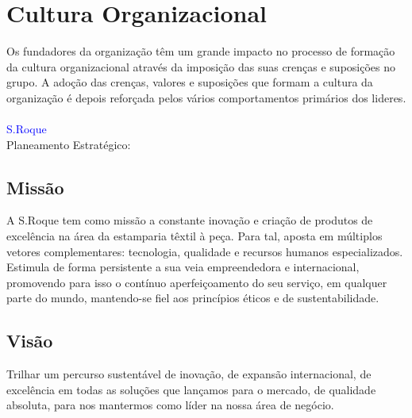 \section{Cultura Organizacional}
\qquad Os fundadores da organização têm um grande impacto no processo de formação da cultura organizacional através da imposição das suas crenças e suposições no grupo. A adoção das crenças, valores e suposições que formam a cultura da organização é depois reforçada pelos vários comportamentos primários dos lideres.\\
\\
\textcolor{blue}{\Large{S.Roque}}\\
Planeamento Estratégico:
\subsection{Missão}

A S.Roque tem como missão a constante inovação e criação de produtos de excelência na área da estamparia têxtil à peça. Para tal, aposta em múltiplos vetores complementares: tecnologia, qualidade e recursos humanos especializados. Estimula de forma persistente a sua veia empreendedora e internacional, promovendo para isso o contínuo aperfeiçoamento do seu serviço, em qualquer parte do mundo, mantendo-se fiel aos princípios éticos e de sustentabilidade.
\subsection{Visão}
Trilhar um percurso sustentável de inovação, de expansão internacional, de excelência em todas as soluções que lançamos para o mercado, de qualidade absoluta, para nos mantermos como líder na nossa área de negócio.
